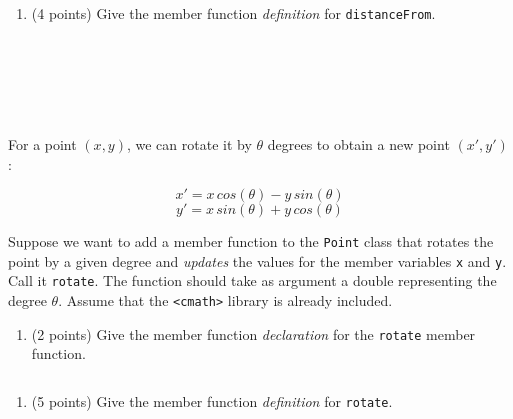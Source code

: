 \documentclass[
]{article}
\providecommand{\tightlist}{%
  \setlength{\itemsep}{0pt}\setlength{\parskip}{0pt}}
\begin{document}
\begin{verbatim}
\end{verbatim}

\begin{enumerate}
\def\labelenumi{\alph{enumi}.}
\setcounter{enumi}{2}
\tightlist
\item
  (4 points) Give the member function \emph{definition} for
  \texttt{distanceFrom}.
\end{enumerate}

\begin{verbatim}






\end{verbatim}

For a point \((x, y)\), we can rotate it by \(\theta\) degrees to obtain
a new point \((x', y')\):

\begin{equation*}
x' = x\, cos(\theta) - y\, sin(\theta)
\end{equation*} \begin{equation*}
y' = x\, sin(\theta) + y\, cos(\theta)
\end{equation*}

Suppose we want to add a member function to the \texttt{Point} class
that rotates the point by a given degree and \emph{updates} the values
for the member variables \texttt{x} and \texttt{y}. Call it
\texttt{rotate}. The function should take as argument a double
representing the degree \(\theta\). Assume that the
\texttt{\textless{}cmath\textgreater{}} library is already included.

\begin{enumerate}
\def\labelenumi{\alph{enumi}.}
\setcounter{enumi}{3}
\tightlist
\item
  (2 points) Give the member function \emph{declaration} for the
  \texttt{rotate} member function.
\end{enumerate}

\begin{verbatim}
\end{verbatim}

\begin{enumerate}
\def\labelenumi{\alph{enumi}.}
\setcounter{enumi}{4}
\tightlist
\item
  (5 points) Give the member function \emph{definition} for
  \texttt{rotate}.
\end{enumerate}

\begin{verbatim}






\end{verbatim}
\end{document}
